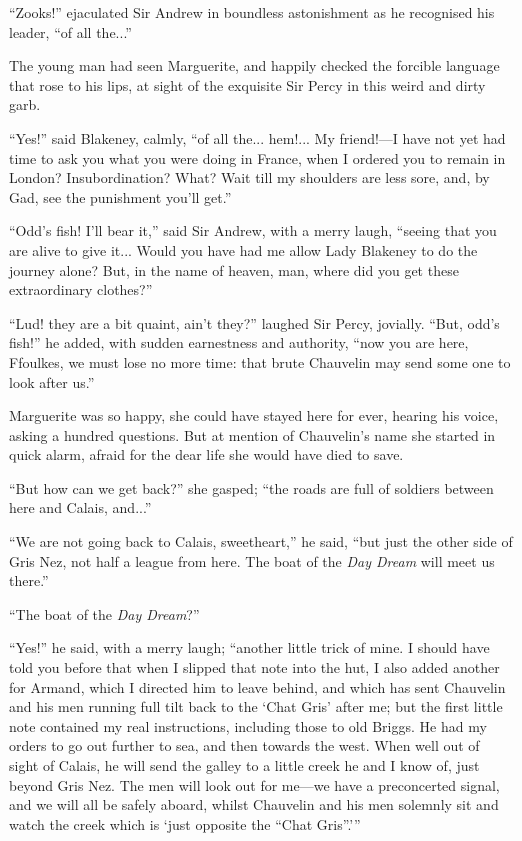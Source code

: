 \documentclass[paper=5.5in:8.5in,BCOR=7mm,twoside,DIV=calc,12pt,usegeometry,chapterprefix,endperiod,headings=big]{scrbook}
\begin{document}
\enquote{Zooks!} ejaculated Sir Andrew in boundless astonishment as he recognised his leader, \enquote{of all the...}

The young man had seen Marguerite, and happily checked the forcible language that rose to his lips, at sight of the exquisite Sir Percy in this weird and dirty garb.

\enquote{Yes!} said Blakeney, calmly, \enquote{of all the... hem!... My friend!---I have not yet had time to ask you what you were doing in France, when I ordered you to remain in London? Insubordination? What? Wait till my shoulders are less sore, and, by Gad, see the punishment you'll get.}

\enquote{Odd's fish! I'll bear it,} said Sir Andrew, with a merry laugh, \enquote{seeing that you are alive to give it... Would you have had me allow Lady Blakeney to do the journey alone? But, in the name of heaven, man, where did you get these extraordinary clothes?}

\enquote{Lud! they are a bit quaint, ain't they?} laughed Sir Percy, jovially. \enquote{But, odd's fish!} he added, with sudden earnestness and authority, \enquote{now you are here, Ffoulkes, we must lose no more time: that brute Chauvelin may send some one to look after us.}

Marguerite was so happy, she could have stayed here for ever, hearing his voice, asking a hundred questions. But at mention of Chauvelin's name she started in quick alarm, afraid for the dear life she would have died to save.

\enquote{But how can we get back?} she gasped; \enquote{the roads are full of soldiers between here and Calais, and...}

\enquote{We are not going back to Calais, sweetheart,} he said, \enquote{but just the other side of Gris Nez, not half a league from here. The boat of the \textit{Day Dream} will meet us there.}

\enquote{The boat of the \textit{Day Dream}?}

\enquote{Yes!} he said, with a merry laugh; \enquote{another little trick of mine. I should have told you before that when I slipped that note into the hut, I also added another for Armand, which I directed him to leave behind, and which has sent Chauvelin and his men running full tilt back to the \enquote{Chat Gris} after me; but the first little note contained my real instructions, including those to old Briggs. He had my orders to go out further to sea, and then towards the west. When well out of sight of Calais, he will send the galley to a little creek he and I know of, just beyond Gris Nez. The men will look out for me---we have a preconcerted signal, and we will all be safely aboard, whilst Chauvelin and his men solemnly sit and watch the creek which is \enquote{just opposite the ``Chat Gris''.}}
\end{document}

